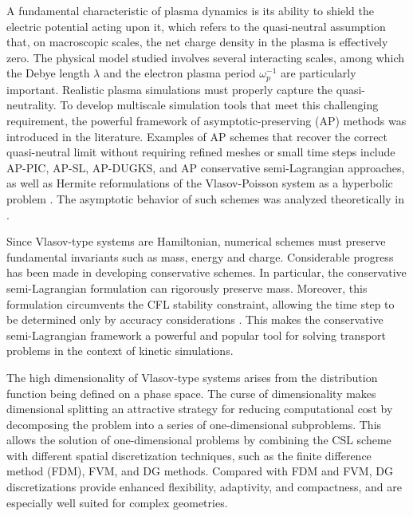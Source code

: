 \documentclass[letterpaper,10pt]{article}
\numberwithin{equation}{section}
\numberwithin{figure}{section}
\numberwithin{table}{section}
\begin{document}
A fundamental characteristic of plasma dynamics is its ability to shield the electric potential acting upon it, which refers to the quasi-neutral assumption that, on macroscopic scales, the net charge density in the plasma is effectively zero.
The physical model studied involves several interacting scales, among which the Debye length $\lambda$ and the electron plasma period $\omega_p^{-1}$ are particularly important.
Realistic plasma simulations must properly capture the quasi-neutrality. 
To develop multiscale simulation tools that meet this challenging requirement, the powerful framework of asymptotic-preserving (AP) methods \cite{Jin1999,Jin2022} was introduced in the literature. Examples of AP schemes that recover the correct quasi-neutral limit without requiring refined meshes or small time steps include AP-PIC\cite{DEGOND2006,DEGOND2010,Ji2023}, AP-SL\cite{DEGOND2009}, AP-DUGKS\cite{LIU2020}, and AP conservative semi-Lagrangian\cite{LIU2025} approaches, as well as Hermite reformulations of the Vlasov-Poisson system as a hyperbolic problem \cite{blaustein2025sap}. The asymptotic behavior of
such schemes was analyzed theoretically in \cite{Degond2008,Crou2016}. 

Since Vlasov-type systems are Hamiltonian, numerical schemes must preserve fundamental invariants such as mass, energy and charge. 
Considerable progress has been made in developing conservative schemes\cite{Cheng2022,LIU2023,CHEN20117018,CHEN201573,CHEN2020109228,QT2025}. 
In particular, the conservative semi-Lagrangian formulation can rigorously preserve mass\cite{QIU2011DG}. 
Moreover, this formulation circumvents the CFL stability constraint, allowing the time step to be determined only by accuracy considerations \cite{Cai2017}.
This makes the conservative semi-Lagrangian framework a powerful and popular tool for solving transport problems in the context of kinetic simulations\cite{Cai2018,Cai2019,QIU2011FD,QIU2010FV,QIU2011DG,CROUSEILLES2010}.

The high dimensionality of Vlasov-type systems arises from the distribution function being defined on a phase space.
The curse of dimensionality makes dimensional splitting an attractive strategy for reducing computational cost by decomposing the problem into a series of one-dimensional subproblems\cite{Strang,CHENG1976330,FOREST1990105,ROSSMANITH20116203}.
This allows the solution of one-dimensional problems by combining the CSL scheme with different spatial discretization techniques, such as the finite difference method (FDM)\cite{chen2021adaptive}, FVM\cite{ZHENG2022114973,ZHENG2024}, and DG methods\cite{QIU2011DG}.
Compared with FDM and FVM, DG discretizations provide enhanced flexibility, adaptivity, and compactness, and are especially well suited for complex geometries.
\end{document}
